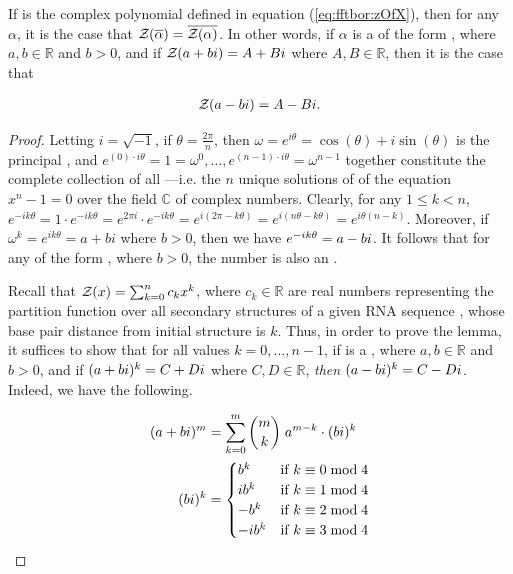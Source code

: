 \begin{lemma}
\label{lem:fftbor:compconj}

If \emZ{} is the complex polynomial defined in
equation (\ref{eq:fftbor:zOfX}), then for any \nRoU
 $\alpha$, it is the case that ${\mathcal Z}_{}(\overline{\alpha}) =
\overline{{\mathcal Z}_{}(\alpha)}$. In other words, if $\alpha$ is a \nRoU
 of the form \aPbi, where $a,b \in \mathbb{R}$ and $b>0$, and
if ${\mathcal Z}_{}(a+bi) = A + Bi$ where $A,B \in \mathbb{R}$, then it is the case that

\begin{align}
{\mathcal Z}_{}(a-bi) = A - Bi.
\end{align}

\end{lemma}

\begin{proof}
Letting $i = \sqrt{-1}$, if
$\theta = \frac{2 \pi}{n}$, then
$\omega = e^{i \theta} = \cos(\theta) + i \sin(\theta)$
is the principal \nRoU, and
$e^{(0) \cdot i \theta} = 1 = \omega^{0}, \dots ,
e^{(n-1) \cdot i \theta} = \omega^{n-1}$ together
constitute the complete collection of all
\nRoUs---i.e. the $n$ unique solutions of
of the equation $x^n -1 = 0$ over the field $\mathbb{C}$ of complex numbers.
Clearly, for any $1 \leq k < n$,
$e^{-i k \theta} = 1 \cdot e^{-i k \theta} =
e^{2 \pi i} \cdot e^{-i k \theta} = e^{i(2 \pi - k \theta)} =
e^{i(n \theta - k \theta)} = e^{i \theta (n - k)}$.
Moreover, if $\omega^k = e^{i k \theta} = a + b i$ where
$b>0$, then we have $e^{-i k \theta} = a-bi$. It follows that for any
\nRoU of the form \aPbi, where $b>0$, the number \aMbi
is also an \nRoU.

Recall that ${\mathcal Z}_{}(x) = \sum_{k=0}^n c_k x^k$, where
$c_k \in \mathbb{R}$ are real numbers representing the partition function
 over
all secondary structures of a given RNA sequence \seqN,
whose base pair distance from initial structure
\strSt is $k$. Thus, in order to prove the lemma, it suffices to show
that for all values $k=0,\dots,n-1$, if \aPbi is a
\nRoU, where $a,b \in \mathbb{R}$
and $b>0$, and if $(a+bi)^k = C+Di$ where $C,D \in \mathbb{R}$, {\em then}
$(a-bi)^k = C-Di$. Indeed, we have the following.

\begin{align}
\begin{split}
(a+bi)^m &= \sum_{k=0}^m {m \choose k}\; a^{m-k} \cdot (bi)^k \\
(bi)^k  &=
\begin{cases}
b^k    & \text{if $k \equiv 0 \bmod 4$} \\
i b^k  & \text{if $k \equiv 1 \bmod 4$} \\
-b^k   & \text{if $k \equiv 2 \bmod 4$} \\
-i b^k & \text{if $k \equiv 3 \bmod 4$} \\
\end{cases}
\end{split}
\end{align}


\end{proof}
